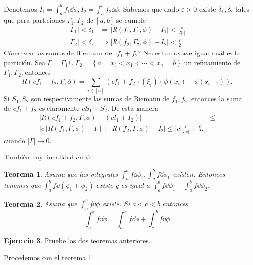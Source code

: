 \documentclass[12pt]{article}
\theoremstyle{plain}
\newtheorem{Th}{Teorema}[subsection]   %
\theoremstyle{definition}
\newtheorem{Ej}[Th]{Ejercicio}
\theoremstyle{remark}
\numberwithin{equation}{section}
\renewcommand{\leq}{\leqslant}      %
\renewcommand{\:}{\colon}           %
\newcommand{\conj}[1]{\left\lbrace#1\right\rbrace}
\newcommand{\bonj}[1]{\left\lbrack#1\right\rbrack}
\begin{document}
\begin{multicols}{2}
\begin{ptcbp}
Denotemos $I_1=\int_{a}^{b}f_1\dd\phi, I_2=\int_{a}^{b}f_2\dd\phi$. Sabemos que dado $\varepsilon>0$ existe $\delta_1,\delta_2$ tales que para particiones $\Gamma_1,\Gamma_2$ de $\bonj{a,b}$ se cumple
\begin{align*}
  |\Gamma_1|<\delta_1 &\Rightarrow |R(f_1,\Gamma_1,\phi)-I_1|<\frac{\varepsilon}{2|c|}\\
  |\Gamma_2|<\delta_2 &\Rightarrow |R(f_2,\Gamma_2,\phi)-I_2|<\frac{\varepsilon}{2}
\end{align*}
Cómo son las sumas de Riemann de $cf_1+f_2$? Necesitamos averiguar cuál es la partición.  Sea $\Gamma=\Gamma_1\cup\Gamma_2=\conj{a=x_0<x_1<\cdots<x_n=b}$ un refinamiento de $\Gamma_1,\Gamma_2$, entonces
$$R(cf_1+f_2,\Gamma,\phi)=\sum_{i\in\bonj{n}}(cf_1+f_2)(\xi_i)(\phi(x_i)-\phi(x_{i-1})).$$
Si $S_1,S_2$ son respectivamente las sumas de Riemann de $f_1, f_2$, entonces la suma de $cf_1+f_2$ es claramente $cS_1+S_2$. De esta manera
\begin{align*}
  |R(cf_1+f_2,\Gamma,\phi)-(cI_1+I_2)| &\leq\\
  |c| |R(f_1,\Gamma,\phi)-I_1|+|R(f_2,\Gamma,\phi)-I_2|\leq |c|\frac{\varepsilon}{2|c|}+\frac{\varepsilon}{2},
\end{align*}
cuando $|\Gamma|\to 0$.
\end{ptcbp}
También hay linealidad en $\phi$.

\begin{Th}\label{thm:linealRespPhi}
   Asuma que las integrales $\int_{a}^{b}f\dd\phi_1, \int_{a}^{b}f\dd\phi_1$ existen. Entonces tenemos que $\int_{a}^{b}f\dd(\phi_1+\phi_2)$ existe y es igual a $\int_{a}^{b}f\dd\phi_1+\int_{a}^{b}f\dd\phi_2$.
\end{Th}

\begin{Th}\label{thm:separarPuntosMediosIntegral}
  Asuma que $\int_{a}^{b}f\dd\phi$ existe. Si $a<c<b$ entonces
  $$\int_{a}^{b}f\dd\phi=\int_{a}^{c}f\dd\phi+\int_{c}^{b}f\dd\phi$$
\end{Th}

\begin{Ej}
  Pruebe los dos teoremas anteriores.
\end{Ej}

Procedemos con el teorema \ref{thm:linealRespPhi}.


\end{multicols}
\end{document}
